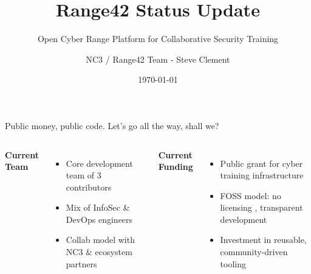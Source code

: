 \documentclass[aspectratio=169]{beamer}
\title{\faIcon{shield-alt}\; Range42 Status Update}
\subtitle{Open Cyber Range Platform for Collaborative Security Training}
\author{NC3 / Range42 Team - Steve Clement}
\date{\today}
\institute{\faServer\; Proxmox \quad \faCogs\; Ansible \quad \faProjectDiagram\; Orchestration \quad \faBinoculars\; Telemetry}
\begin{document}
\begin{frame}
  \titlepage
\end{frame}



\begin{frame}[shrink=8]{Public money, public code. Let's go all the way, shall we?}
  \begin{columns}[T]
    \textbf{Current Team}
    \begin{itemize}
      \item Core development team of 3 contributors
      \item Mix of InfoSec \& DevOps engineers
      \item Collab model with NC3 \& ecosystem partners
    \end{itemize}
    
    \textbf{Current Funding}
    \begin{itemize}
      \item Public grant for cyber training infrastructure
      \item FOSS model: no licensing \textcolor{green}{\faMoneyBill}, transparent development
      \item Investment in reusable, community-driven tooling
    \end{itemize}
    

\end{columns}
\end{frame}
\end{document}
